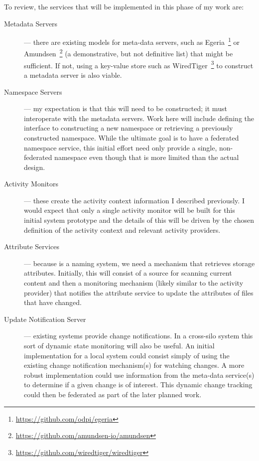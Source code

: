 To review, the services that will be implemented in this phase of my work are:

\begin{description}
    \item[Metadata Servers] --- there are existing models for meta-data servers,
        such as Egeria~\footnote{\url{https://github.com/odpi/egeria}} or
        Amundsen~\footnote{\url{https://github.com/amundsen-io/amundsen}} (a
        demonstrative, but not definitive list) that might be sufficient. If
        not, using a key-value store such as
        WiredTiger~\footnote{\url{https://github.com/wiredtiger/wiredtiger}} to
        construct a metadata server is also viable. 

    \item[Namespace Servers] --- my expectation is that this will need to be
        constructed; it must interoperate with the metadata servers.  Work here will
        include defining the interface to constructing a new namespace or retrieving
        a previously constructed namespace. While the ultimate goal is to have a
        federated namespace service, this initial effort need only provide a single,
        non-federated namespace even though that is more limited than the actual
        design.

    \item[Activity Monitors] --- these create the activity context information I
        described previously.  I would expect that only a single activity monitor
        will be built for this initial system prototype and the details of this will
        be driven by the chosen definition of the activity context and relevant
        activity providers.

    \item[Attribute Services] --- because \system is a naming system, we need a
        mechanism that retrieves storage attributes. Initially, this will consist of
        a source for scanning current content and then a monitoring mechanism
        (likely similar to the activity provider) that notifies the attribute
        service to update the attributes of files that have changed.

    \item[Update Notification Server] --- existing systems provide change
        notifications.  In a cross-silo system this sort of dynamic state monitoring
        will also be useful.  An initial implementation for a local system could
        consist simply of using the existing change notification mechanism(s) for
        watching changes.  A more robust implementation could use information from
        the meta-data service(s) to determine if a given change is of interest.
        This dynamic change tracking could then be federated as part of the later
        planned work.
\end{description}


